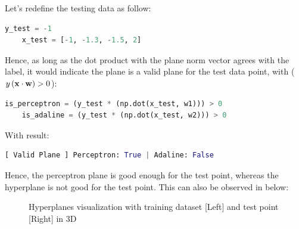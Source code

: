 \documentclass{tron}
\begin{document}
Let's redefine the testing data as follow:
\begin{lstlisting}[language=python, style=mystyle]
	y_test = -1
	x_test = [-1, -1.3, -1.5, 2]
\end{lstlisting}

\vspace{-20pt}
Hence, as long as the dot product with the plane norm vector agrees with the label, it would indicate the plane is a valid plane for the test data point, with ($y \, (\mathbf{x} \cdot \mathbf{w}) > 0$):

\begin{lstlisting}[language=python, style=mystyle]
	is_perceptron = (y_test * (np.dot(x_test, w1))) > 0
	is_adaline = (y_test * (np.dot(x_test, w2))) > 0
\end{lstlisting}

\vspace{-20pt}
With result:
\begin{lstlisting}[language=python, style=mystyle:output]
	[ Valid Plane ] Perceptron: True | Adaline: False
\end{lstlisting}

\vspace{-20pt}
Hence, the perceptron plane is good enough for the test point, whereas the hyperplane is not good for the test point. This can also be observed in  below:

\begin{figure}[H]
	\centering
	\caption{Hyperplanes visualization with training dataset [Left] and test point [Right] in 3D  \label{fig:q1:d:result}}
\end{figure}
\end{document}
